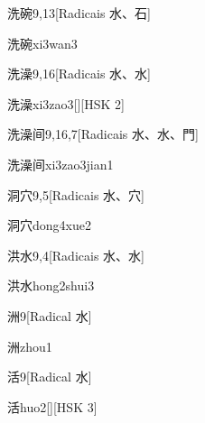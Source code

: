 \begin{entry}{洗碗}{9,13}[Radicais ⽔、⽯]
  \begin{phonetics}{洗碗}{xi3wan3}
  \end{phonetics}
\end{entry}

\begin{entry}{洗澡}{9,16}[Radicais ⽔、⽔]
  \begin{phonetics}{洗澡}{xi3zao3}[][HSK 2]
  \end{phonetics}
\end{entry}

\begin{entry}{洗澡间}{9,16,7}[Radicais ⽔、⽔、⾨]
  \begin{phonetics}{洗澡间}{xi3zao3jian1}
  \end{phonetics}
\end{entry}

\begin{entry}{洞穴}{9,5}[Radicais ⽔、⽳]
  \begin{phonetics}{洞穴}{dong4xue2}
  \end{phonetics}
\end{entry}

\begin{entry}{洪水}{9,4}[Radicais ⽔、⽔]
  \begin{phonetics}{洪水}{hong2shui3}
  \end{phonetics}
\end{entry}

\begin{entry}{洲}{9}[Radical ⽔]
  \begin{phonetics}{洲}{zhou1}
  \end{phonetics}
\end{entry}

\begin{entry}{活}{9}[Radical ⽔]
  \begin{phonetics}{活}{huo2}[][HSK 3]
  \end{phonetics}
\end{entry}

